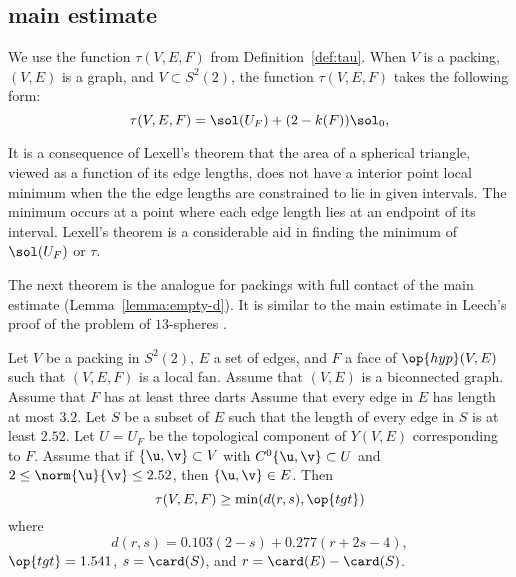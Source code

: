 \subsection{main estimate}




We use the function $\tau(V,E,F)$ from Definition~\ref{def:tau}.  When
$V$ is a packing, $(V,E)$ is a  graph, and
$V\subset S^2(2)$, the function $\tau(V,E,F)$ takes the following
form:
\[
\tau(V,E,F) = \sol(U_F) + (2-k(F)) \sol_0,
\]

\begin{remark}
  It is a consequence of Lexell's theorem that the area of a spherical
  triangle, viewed as a function of its edge lengths, does not have a
  interior point local minimum when the the edge lengths are
  constrained to lie in given intervals.  The minimum occurs at a
  point where each edge length lies at an endpoint of its interval.
  Lexell's theorem is a considerable aid in finding the minimum of
  $\sol(U_F)$ or $\tau$.
\end{remark}

The next theorem is the analogue for packings with full contact of the
main estimate (Lemma~\ref{lemma:empty-d}).  It is similar to the main
estimate in Leech's proof of the problem of $13$-spheres
\cite{Leech:1956:MG}.


\begin{theorem}\label{lemma:main-estimate-12}
  Let $V$ be a packing in $S^2(2)$, $E$ a set of edges, and $F$ a face
  of $\op{hyp}(V,E)$ such that $(V,E,F)$ is a local fan.  Assume that
  $(V,E)$ is a biconnected graph.  Assume that $F$ has at least three
  darts Assume that every edge in $E$ has length at most $3.2$.  Let
  $S$ be a subset of $E$ such that the length of every edge in $S$ is
  at least $2.52$.  Let $U=U_F$ be the topological component of
  $Y(V,E)$ corresponding to $F$.  Assume that if $\{\u,\v\}\subset V$
  with $C^0\{\u,\v\}\subset U$ and $2\le\norm{\u}{\v} \le 2.52$, then
  $\{\u,\v\}\in E$.  Then
\[\tau(V,E,F) \ge \min(d(r,s),\op{tgt})\]
where
\[
d(r,s) = 0.103 (2-s) + 0.277 (r+2s-4),
\]
$\op{tgt}=1.541$, 
$s = \card(S)$, and $r = \card(E)-\card(S)$.
\end{theorem}

